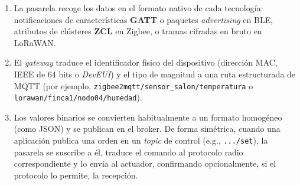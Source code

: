\documentclass[../main.tex]{subfiles}
\begin{document}
                \begin{enumerate}
                    \item La pasarela recoge los datos en el formato nativo de cada tecnología: notificaciones de características \textbf{GATT} o paquetes \emph{advertising} en BLE, atributos de clústeres \textbf{ZCL} en Zigbee, o tramas cifradas en bruto en LoRaWAN.
                    \item El \emph{gateway} traduce el identificador físico del dispositivo (dirección MAC, IEEE de 64 bits o \emph{DevEUI}) y el tipo de magnitud a una ruta estructurada de MQTT (por ejemplo, \texttt{zigbee2mqtt/sensor\_salon/temperatura} o \texttt{lorawan/finca1/nodo04/humedad}).
                    \item Los valores binarios se convierten habitualmente a un formato homogéneo (como JSON) y se publican en el broker. De forma simétrica, cuando una aplicación publica una orden en un \emph{topic} de control (e.g., \texttt{.../set}), la pasarela se suscribe a él, traduce el comando al protocolo radio correspondiente y lo envía al actuador, confirmando opcionalmente, si el protocolo lo permite, la recepción.
                \end{enumerate}
\end{document}
